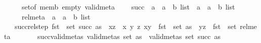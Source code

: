 \begin{isabellebody}
\ \ \ \ \ set{\isacharunderscore}{\kern0pt}of\ memb\ empty\ valid{\isacharunderscore}{\kern0pt}meta\ {\isacharplus}{\kern0pt}\isanewline
\ \ \ succ\ {\isacharcolon}{\kern0pt}{\isacharcolon}{\kern0pt}\ {\isachardoublequoteopen}{\isacharparenleft}{\kern0pt}{\isacharparenleft}{\kern0pt}{\isacharprime}{\kern0pt}a\ {\isacharasterisk}{\kern0pt}\ {\isacharprime}{\kern0pt}a{\isacharparenright}{\kern0pt}\ {\isacharasterisk}{\kern0pt}\ {\isacharprime}{\kern0pt}b{\isacharparenright}{\kern0pt}\ list\ {\isasymRightarrow}\ {\isacharparenleft}{\kern0pt}{\isacharparenleft}{\kern0pt}{\isacharprime}{\kern0pt}a\ {\isacharasterisk}{\kern0pt}\ {\isacharprime}{\kern0pt}a{\isacharparenright}{\kern0pt}\ {\isacharasterisk}{\kern0pt}\ {\isacharprime}{\kern0pt}b{\isacharparenright}{\kern0pt}\ list{\isachardoublequoteclose}\isanewline
\ \ \ \ \ rel{\isacharunderscore}{\kern0pt}meta\ {\isacharcolon}{\kern0pt}{\isacharcolon}{\kern0pt}\ {\isachardoublequoteopen}{\isacharparenleft}{\kern0pt}{\isacharparenleft}{\kern0pt}{\isacharprime}{\kern0pt}a\ {\isacharasterisk}{\kern0pt}\ {\isacharprime}{\kern0pt}a{\isacharparenright}{\kern0pt}\ {\isacharasterisk}{\kern0pt}\ {\isacharprime}{\kern0pt}b{\isacharparenright}{\kern0pt}\ list{\isachardoublequoteclose}\isanewline
\ \ \ succ{\isacharunderscore}{\kern0pt}rel{\isacharunderscore}{\kern0pt}step{\isacharcolon}{\kern0pt}\ {\isachardoublequoteopen}fst\ {\isacharbackquote}{\kern0pt}\ set\ {\isacharparenleft}{\kern0pt}succ\ as{\isacharparenright}{\kern0pt}\ {\isacharequal}{\kern0pt}\ {\isacharbraceleft}{\kern0pt}{\isacharparenleft}{\kern0pt}x{\isacharcomma}{\kern0pt}z{\isacharparenright}{\kern0pt}\ {\isacharbar}{\kern0pt}\ x\ y\ z{\isachardot}{\kern0pt}\ {\isacharparenleft}{\kern0pt}x{\isacharcomma}{\kern0pt}y{\isacharparenright}{\kern0pt}\ {\isasymin}\ fst\ {\isacharbackquote}{\kern0pt}\ set\ as\ {\isasymand}\ {\isacharparenleft}{\kern0pt}y{\isacharcomma}{\kern0pt}z{\isacharparenright}{\kern0pt}\ {\isasymin}\ fst\ {\isacharbackquote}{\kern0pt}\ set\ rel{\isacharunderscore}{\kern0pt}meta{\isacharbraceright}{\kern0pt}{\isachardoublequoteclose}\isanewline
\ \ \ \ \ \ \ succ{\isacharunderscore}{\kern0pt}valid{\isacharunderscore}{\kern0pt}metas{\isacharcolon}{\kern0pt}\ {\isachardoublequoteopen}valid{\isacharunderscore}{\kern0pt}metas\ {\isacharparenleft}{\kern0pt}set\ as{\isacharparenright}{\kern0pt}\ {\isasymLongrightarrow}\ valid{\isacharunderscore}{\kern0pt}metas\ {\isacharparenleft}{\kern0pt}set\ {\isacharparenleft}{\kern0pt}succ\ as{\isacharparenright}{\kern0pt}{\isacharparenright}{\kern0pt}{\isachardoublequoteclose}\isanewline

\end{isabellebody}
